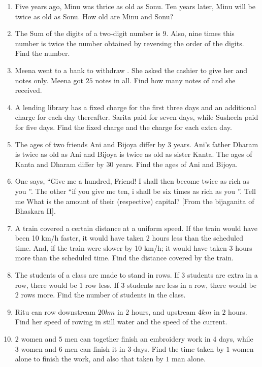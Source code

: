 \begin{enumerate}[label=\thesubsection.\arabic*, ref=\thesubsection.\theenumi]
\item Five years ago,  Minu was thrice as old as Sonu.  Ten years later,  Minu will be twice as old as Sonu.  How old are Minu and Sonu?
\item The Sum of the digits of a two-digit number is $9$.  Also,  nine times this number is twice the number obtained by reversing the order of the digits.  Find the number. 
\item Meena went to a bank to withdraw .  She asked the cashier to give her  and  notes only.  Meena got $25$ notes in all.  Find how many notes of  and  she received. 
\item A lending library has a fixed charge for the first three days and an additional charge for each day thereafter.  Sarita paid  for seven days,  while Susheela paid  for five days.  Find the fixed charge and the charge for each extra day.   
\item The ages of two friends Ani and Bijoya differ  by $3$  years.  Ani's father Dharam is twice as old as Ani and Bijoya is twice as old as sister Kanta.  The ages of Kanta and Dharam differ by $30$ years.  Find the ages of Ani and Bijoya. 
\item  One says,  \textquotedblleft Give me a hundred,  Friend!  I shall then become twice as rich as you \textquotedblright.  The other \textquotedblleft  if you give me ten,  i shall be six times as rich as you \textquotedblright.   Tell me What is the amount of their (respective) capital? [From the bijaganita of Bhaskara II].  
\item A train covered a certain distance at a uniform speed.  If the train would have been 10 km/h faster,  it would have taken $2$ hours less than the scheduled time.  And,  if the train were slower by 10 km/h; it would have taken $3$ hours more than the scheduled time.  Find the distance covered by the train. 
\item The students of a class are made to stand in rows.  If 3 students are extra in a row,  there would be $1$ row less.  If $3$ students are less in a row,  there would be $2$ rows more.  Find the number of students in the class. 
\item Ritu can row downstream $20km$ in $2$ hours, and upstream $4km$ in $2$ hours. Find her speed of rowing in still water and the speed of the current. 
\item $2$ women and $5$ men can together finish an embroidery work in $4$ days,  while $3$ women and $6$ men can finish it in $3$ days.  Find the time taken by $1$ women alone to finish the work, and also that taken by $1$ man alone. 

\end{enumerate}

